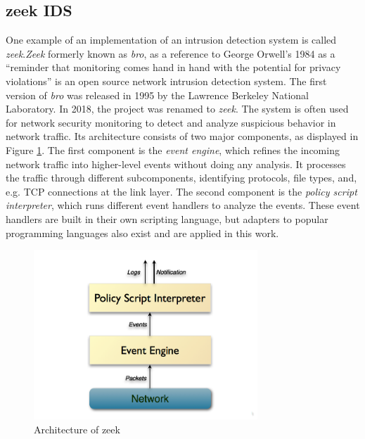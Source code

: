 \subsection{zeek IDS}
One example of an implementation of an intrusion detection system is called \emph{zeek}.\emph{Zeek} formerly known as \emph{bro}, as a reference to George Orwell's 1984 as a ``reminder that monitoring comes hand in hand with the potential for privacy violations'' \cite{zeek2023} is an open source network intrusion detection system. The first version of \emph{bro} was released in 1995 by the Lawrence Berkeley National Laboratory. In 2018, the project was renamed to \emph{zeek}. The system is often used for network security monitoring to detect and analyze suspicious behavior in network traffic. Its architecture consists of two major components, as displayed in Figure \ref{fig:zeek_architecture}. The first component is the \emph{event engine}, which refines the incoming network traffic into higher-level events without doing any analysis. It processes the traffic through different subcomponents, identifying protocols, file types, and, e.g. TCP connections at the link layer. The second component is the \emph{policy script interpreter}, which runs different event handlers to analyze the events. These event handlers are built in their own scripting language, but adapters to popular programming languages also exist and are applied in this work.

\begin{figure}[H]
	\sffamily\footnotesize
	\includegraphics[width=0.75\textwidth]{pic/zeek_architecture.png}
	\unitlength=0.75mm
	\linethickness{0.4pt}
	\caption{Architecture of zeek \cite{zeek2023}}
	\label{fig:zeek_architecture}
\end{figure}

